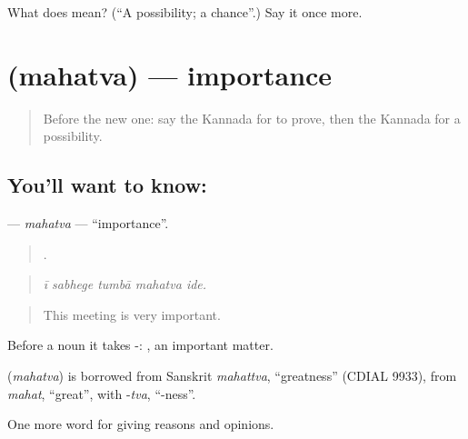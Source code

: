\begin{tcolorbox}[breakable,colback=teal!4,colframe=teal!35!black,title={Before you move on}]
What does  mean? (\textquotedblleft{}A possibility; a chance\textquotedblright{}.) Say it once more.
\end{tcolorbox}
\section[\texorpdfstring{\kn{ಮಹತ್ವ} (mahatva)}{ಮಹತ್ವ (mahatva)}]{ (mahatva) — importance}

\label{lesson:KA-C376-mahatva}



\begin{quote}
Before the new one: say the Kannada for to prove, then the Kannada for a possibility.
\end{quote}

\subsection*{You'll want to know: }
\textbf{} — \emph{mahatva} — \textquotedblleft{}importance\textquotedblright{}.

\begin{quote}
    .
\end{quote}

\begin{quote}
\emph{ī sabhege tumbā mahatva ide.}
\end{quote}

\begin{quote}
This meeting is very important.
\end{quote}

Before a noun it takes -:  , an important matter.

\begin{cousinweb}
\textbf{} (\emph{mahatva}) is borrowed from Sanskrit \emph{mahattva}, \textquotedblleft{}greatness\textquotedblright{} (CDIAL 9933), from \emph{mahat}, \textquotedblleft{}great\textquotedblright{}, with -\emph{tva}, \textquotedblleft{}-ness\textquotedblright{}.
\end{cousinweb}

\begin{grammarlens}[title={What you've built}]
One more word for giving reasons and opinions.
\end{grammarlens}


